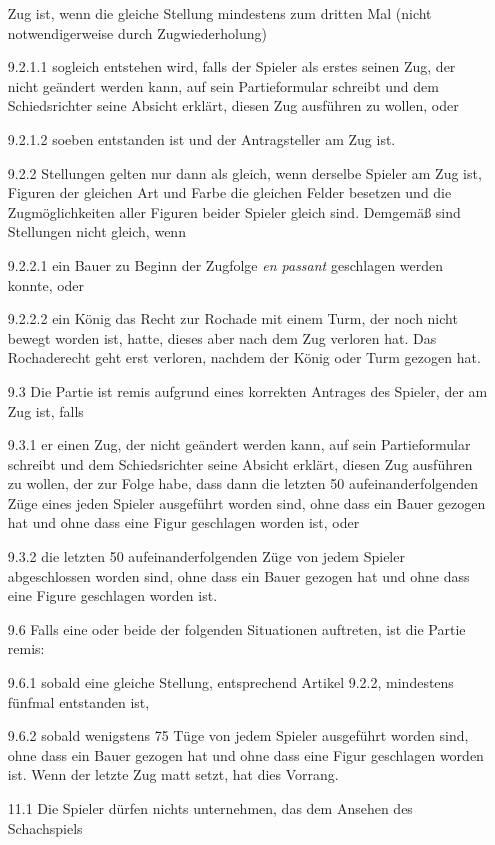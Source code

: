 \documentclass[
  a4paper,
  justified,
  nobib,
]{tufte-handout}
\begin{document}
\begin{enumerate}
    Zug ist, wenn die gleiche Stellung mindestens zum dritten Mal (nicht notwendigerweise
    durch Zugwiederholung)
  \item[9.2.1.1] sogleich entstehen wird, falls der Spieler als erstes seinen Zug, der
    nicht geändert werden kann, auf sein Partieformular schreibt und dem Schiedsrichter
    seine Absicht erklärt, diesen Zug ausführen zu wollen, oder
  \item[9.2.1.2] soeben entstanden ist und der Antragsteller am Zug ist.
  \item[9.2.2] Stellungen gelten nur dann als gleich, wenn derselbe Spieler am Zug ist,
    Figuren der gleichen Art und Farbe die gleichen Felder besetzen und die
    Zugmöglichkeiten aller Figuren beider Spieler gleich sind.
    Demgemäß sind Stellungen nicht gleich, wenn
  \item[9.2.2.1] ein Bauer zu Beginn der Zugfolge \emph{en passant} geschlagen werden
    konnte, oder
  \item[9.2.2.2] ein König das Recht zur Rochade mit einem Turm, der noch nicht bewegt
    worden ist, hatte, dieses aber nach dem Zug verloren hat. Das Rochaderecht geht erst
    verloren, nachdem der König oder Turm gezogen hat.
  \item[9.3] Die Partie ist remis aufgrund eines korrekten Antrages des Spieler, der am
    Zug ist, falls
  \item[9.3.1] er einen Zug, der nicht geändert werden kann, auf sein Partieformular
    schreibt und dem Schiedsrichter seine Absicht erklärt, diesen Zug ausführen zu wollen,
    der zur Folge habe, dass dann die letzten 50 aufeinanderfolgenden Züge eines jeden
    Spieler ausgeführt worden sind, ohne dass ein Bauer gezogen hat und ohne dass eine
    Figur geschlagen worden ist, oder
  \item[9.3.2] die letzten 50 aufeinanderfolgenden Züge von jedem Spieler abgeschlossen
    worden sind, ohne dass ein Bauer gezogen hat und ohne dass eine Figure geschlagen
    worden ist.
  \item[9.6] Falls eine oder beide der folgenden Situationen auftreten, ist die Partie
    remis:
  \item[9.6.1] sobald eine gleiche Stellung, entsprechend Artikel 9.2.2, mindestens
    fünfmal entstanden ist,
  \item[9.6.2] sobald wenigstens 75 Tüge von jedem Spieler ausgeführt worden sind, ohne
    dass ein Bauer gezogen hat und ohne dass eine Figur geschlagen worden ist.
    Wenn der letzte Zug matt setzt, hat dies Vorrang.
  \item[11.1] Die Spieler dürfen nichts unternehmen, das dem Ansehen des Schachspiels

\end{enumerate}
\end{document}
